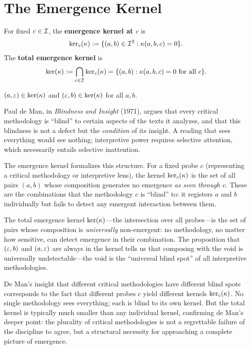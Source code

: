 \section{The Emergence Kernel}

\begin{definition}
For fixed $c \in \mathcal{I}$, the \textbf{emergence kernel at $c$} is
\[
    \ker_c(\kappa) := \{(a, b) \in \mathcal{I}^2 : \kappa(a, b, c) = 0\}.
\]
The \textbf{total emergence kernel} is
\[
    \ker(\kappa) := \bigcap_{c \in \mathcal{I}} \ker_c(\kappa)
    = \{(a,b) : \kappa(a,b,c) = 0 \text{ for all } c\}.
\]
\end{definition}

\begin{proposition}
$(a, \varepsilon) \in \ker(\kappa)$ and $(\varepsilon, b) \in \ker(\kappa)$ for
all $a, b$.
\end{proposition}

\begin{interpretation}\label{interp:ch5:kernel_de_man}
Paul de Man, in \emph{Blindness and Insight} (1971), argues that every
critical methodology is ``blind'' to certain aspects of the texts it
analyzes, and that this blindness is not a defect but the \emph{condition}
of its insight. A reading that sees everything would see nothing;
interpretive power requires selective attention, which necessarily entails
selective inattention.

The emergence kernel formalizes this structure. For a fixed probe $c$
(representing a critical methodology or interpretive lens), the kernel
$\ker_c(\kappa)$ is the set of all pairs $(a, b)$ whose composition
generates no emergence \emph{as seen through $c$}. These are the
combinations that the methodology $c$ is ``blind'' to: it registers
$a$ and $b$ individually but fails to detect any emergent interaction
between them.

The total emergence kernel $\ker(\kappa)$---the intersection over all
probes---is the set of pairs whose composition is \emph{universally}
non-emergent: no methodology, no matter how sensitive, can detect
emergence in their combination. The proposition that $(\varepsilon, b)$ and
$(a, \varepsilon)$ are always in the kernel tells us that composing with the
void is universally undetectable---the void is the ``universal blind
spot'' of all interpretive methodologies.

De Man's insight that different critical methodologies have different
blind spots corresponds to the fact that different probes $c$ yield
different kernels $\ker_c(\kappa)$. No single methodology sees
everything; each is blind to its own kernel. But the total kernel is
typically much smaller than any individual kernel, confirming de Man's
deeper point: the plurality of critical methodologies is not a
regrettable failure of the discipline to agree, but a structural
necessity for approaching a complete picture of emergence.
\end{interpretation}

